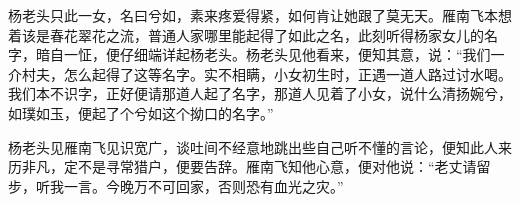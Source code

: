 杨老头只此一女，名曰兮如，素来疼爱得紧，如何肯让她跟了莫无天。雁南飞本想着该是春花翠花之流，普通人家哪里能起得了如此之名，此刻听得杨家女儿的名字，暗自一怔，便仔细端详起杨老头。杨老头见他看来，便知其意，说：“我们一介村夫，怎么起得了这等名字。实不相瞒，小女初生时，正遇一道人路过讨水喝。我们本不识字，正好便请那道人起了名字，那道人见着了小女，说什么清扬婉兮，如璞如玉，便起了个兮如这个拗口的名字。”

杨老头见雁南飞见识宽广，谈吐间不经意地跳出些自己听不懂的言论，便知此人来历非凡，定不是寻常猎户，便要告辞。雁南飞知他心意，便对他说：“老丈请留步，听我一言。今晚万不可回家，否则恐有血光之灾。”











